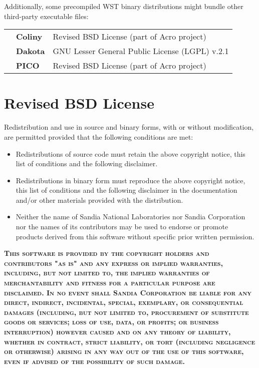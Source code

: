Additionally, some precompiled WST binary distributions might bundle
other third-party executable files:

\begin{tabularx}{\textwidth}{p{0.5in}lX}
&\bf Coliny & Revised BSD License (part of Acro project) \\
&\bf Dakota & GNU Lesser General Public License (LGPL) v.2.1 \\
&\bf PICO & Revised BSD License (part of Acro project) \\
\end{tabularx}
  
\section*{Revised BSD License}
Redistribution and use in source and binary forms, with or without
modification, are permitted provided that the following conditions are
met:
\begin{itemize}
\item Redistributions of source code must retain the above copyright
  notice, this list of conditions and the following disclaimer.
\item Redistributions in binary form must reproduce the above copyright
  notice, this list of conditions and the following disclaimer in the
  documentation and/or other materials provided with the distribution.
\item Neither the name of Sandia National Laboratories nor Sandia
  Corporation nor the names of its contributors may be used to endorse
  or promote products derived from this software without specific prior
  written permission.
\end{itemize}


\textsc{\bfseries This software is provided by the copyright holders and contributors "as is" and
any express or implied warranties, including, but not limited to, the implied
warranties of merchantability and fitness for a particular purpose are
disclaimed. In no event shall Sandia Corporation be liable for any
direct, indirect, incidental, special, exemplary, or consequential damages
(including, but not limited to, procurement of substitute goods or services;
loss of use, data, or profits; or business interruption) however caused and
on any theory of liability, whether in contract, strict liability, or tort
(including negligence or otherwise) arising in any way out of the use of this
software, even if advised of the possibility of such damage.}

